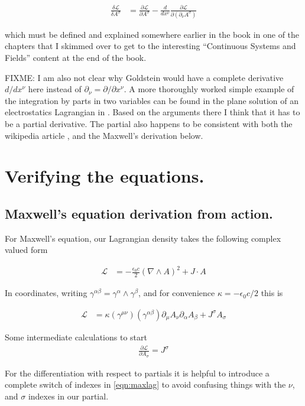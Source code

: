 \documentclass{article}
\newcommand{\LL}[0]{\mathcal{L}}
\newcommand{\PD}[2]{\frac{\partial {#2}}{\partial {#1}}}
\newcommand{\grad}[0]{\nabla}
\begin{document}
\begin{align*}
\frac{\delta \LL}{\delta A^\sigma} &= \PD{A^\sigma}{\LL} - \frac{d}{dx^\nu} \PD{(\partial_\nu A^\sigma)}{\LL}
\end{align*}

which must be defined and explained somewhere earlier in the book in one of the chapters that I skimmed over to get to the interesting ``Continuous Systems and Fields'' content
at the end of the book.

FIXME: I am also not clear why Goldstein would have a complete derivative $d/dx^\nu$ here instead of $\partial_\nu = \partial/{\partial x^\nu}$.  A more thoroughly worked simple example
of the integration by parts in two variables can be found in the plane solution of an electrostatics Lagrangian in \cite{PJMaxwellLagrangian}.  Based on the arguments there I think that it has to be a partial derivative.   The partial also happens to be consistent with both the wikipedia article \cite{wikiemtensor}, and the Maxwell's derivation below.

\section{ Verifying the equations. }
\subsection{ Maxwell's equation derivation from action. }

For Maxwell's equation, our Lagrangian density takes the following complex valued form

\begin{align}\label{eqn:maxlag}
\LL &= -\frac{\epsilon_0 c}{2} (\grad \wedge A)^2 + J \cdot A
\end{align}

In coordinates, writing $\gamma^{\alpha\beta} = \gamma^\alpha \wedge \gamma^\beta$, and 
for convenience $\kappa = -\epsilon_0 c /2$ this is

\begin{align}\label{eqn:maxlagcomp}
\LL &= \kappa (\gamma^{\mu\nu}) (\gamma^{\alpha\beta}) \partial_\mu A_\nu \partial_\alpha A_\beta + J^\sigma A_\sigma
\end{align}

Some intermediate calculations to start
\begin{align*}
\PD{A_\sigma}{\LL} = J^\sigma
\end{align*}

For the differentiation with respect to partials it is helpful to introduce a complete switch of indexes in \ref{eqn:maxlag}
to avoid confusing things with the $\nu$, and $\sigma$ indexes in our partial.
\end{document}
